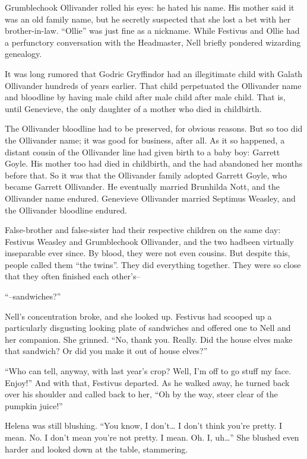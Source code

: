 Grumblechook Ollivander rolled his eyes: he hated his name. His mother said it was an old family name, but he secretly suspected that she lost a bet with her brother-in-law. “Ollie” was just fine as a nickname. While Festivus and Ollie had a perfunctory conversation with the Headmaster, Nell briefly pondered wizarding genealogy.

It was long rumored that Godric Gryffindor had an illegitimate child with Galath Ollivander hundreds of years earlier. That child perpetuated the Ollivander name and bloodline by having male child after male child after male child. That is, until Genevieve, the only daughter of a mother who died in childbirth.

The Ollivander bloodline had to be preserved, for obvious reasons. But so too did the Ollivander name; it was good for business, after all. As it so happened, a distant cousin of the Ollivander line had given birth to a baby boy: Garrett Goyle. His mother too had died in childbirth, and the had abandoned her months before that. So it was that the Ollivander family adopted Garrett Goyle, who became Garrett Ollivander. He eventually married Brunhilda Nott, and the Ollivander name endured. Genevieve Ollivander married Septimus Weasley, and the Ollivander bloodline endured.

False-brother and false-sister had their respective children on the same day: Festivus Weasley and Grumblechook Ollivander, and the two hadbeen virtually inseparable ever since. By blood, they were not even cousins. But despite this, people called them “the twins”. They did everything together. They were so close that they often finished each other’s–

“–sandwiches?”

Nell’s concentration broke, and she looked up. Festivus had scooped up a particularly disgusting looking plate of sandwiches and offered one to Nell and her companion. She grinned. “No, thank you. Really. Did the house elves make that sandwich? Or did you make it out of house elves?”

“Who can tell, anyway, with last year’s crop? Well, I’m off to go stuff my face. Enjoy!” And with that, Festivus departed. As he walked away, he turned back over his shoulder and called back to her, “Oh by the way, steer clear of the pumpkin juice!”

Helena was still blushing. “You know, I don’t… I don’t think you’re pretty. I mean. No. I don’t mean you’re not pretty. I mean. Oh. I, uh…” She blushed even harder and looked down at the table, stammering.

